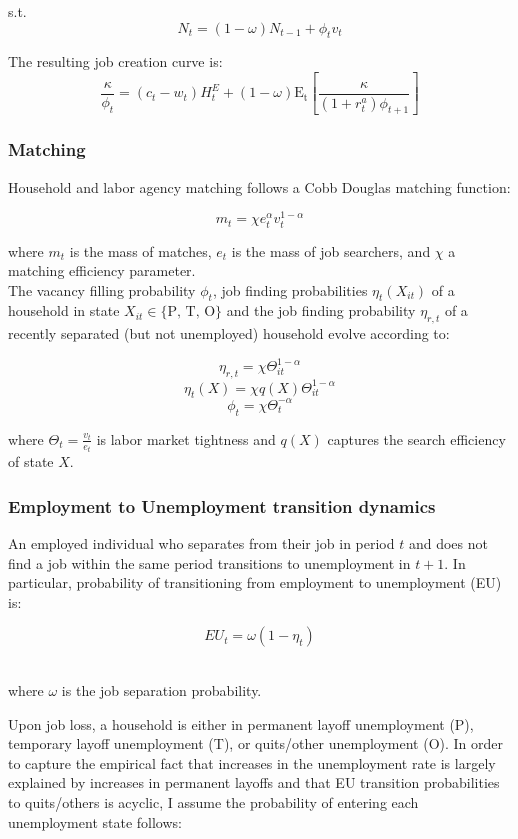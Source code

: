 s.t.
$$ N_{t} = (1-\omega)N_{t-1} + \phi_{t} v_{t}$$ 

The resulting job creation curve is:
$$ \frac{\kappa}{\phi_{t}}  = (c_{t} - w_{t})H^{E}_{t} +  (1-\omega)\mathrm{E_{t}}\left[   \frac{\kappa}{(1+r^{a}_{t}) \phi_{t+1}} \right]   $$


\hypertarget{Matching}{}
\subsubsection{Matching}

Household and labor agency matching follows a Cobb Douglas matching function:

$$m_{t} = \chi e_{t}^{\alpha} v_{t}^{1-\alpha}$$ 

where $m_{t}$ is the mass of matches, $ e_{t} $ is the mass of job searchers, and $\chi$ a matching efficiency parameter.\\

The vacancy filling probability $\phi_{t}$, job finding probabilities $\eta_{t}(X_{it})$ of a household in state $X_{it} \in \{ \text{P, T, O} \}$ and the job finding probability $\eta_{r,t}$ of a recently separated (but not unemployed) household evolve according to:

$$\eta_{r,t} = \chi \Theta_{it}^{1-\alpha} $$
$$\eta_{t}(X) = \chi q(X) \Theta_{it}^{1-\alpha} $$
$$ \phi_{t} = \chi \Theta_{t}^{-\alpha} $$ 
\vspace{.1cm}

where $\Theta_{t} = \frac{v_{t}}{e_{t}}$ is labor market tightness and $q(X)$ captures the search efficiency of state $X$.

\hypertarget{Employment to Unemployment transition dynamics}{}
\subsubsection{Employment to Unemployment transition dynamics}

An employed individual who separates from their job in period $t$ and does not find a job within the same period transitions to unemployment in $t+1$. In particular, probability of transitioning from employment to unemployment (EU) is:


$$ EU_{t} = \omega ( 1 - \eta_{t}) $$\

where $\omega$ is the job separation probability. 

\vspace{.5cm}

Upon job loss, a household is either in permanent layoff unemployment (P), temporary layoff unemployment (T), or quits/other unemployment (O). In order to capture the empirical fact that increases in the unemployment rate is largely explained by increases in permanent layoffs and that EU transition probabilities to quits/others is acyclic, I assume the probability of entering each unemployment state follows:


